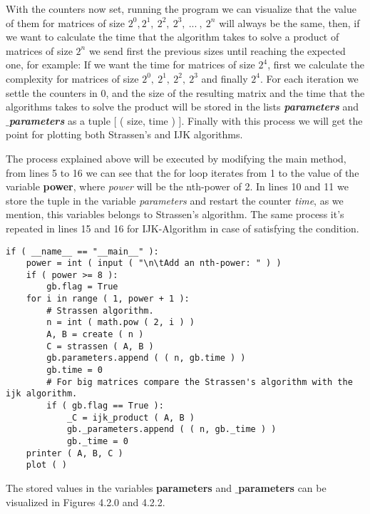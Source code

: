 With the counters now set, running the program we can visualize that the value of them for matrices of size $2^{0}, 2^{1},\ 2^{2},\ 2^{3},\ ...\ ,\ 2^{n}$ will always be the same, then, if we want to calculate the time that the algorithm takes to solve a product of matrices of size $2^{n}$ we send first the previous sizes until reaching the expected one, for example: If we want the time for matrices of size $2^{4}$, first we calculate the complexity for matrices of size $2^{0},\ 2^{1},\ 2^{2},\ 2^{3}$ and finally $2^{4}$. For each iteration we settle the counters in 0, and the size of the resulting matrix and the time that the algorithms takes to solve the product will be stored in the lists {\bfseries\itshape parameters} and {\bfseries\itshape $\_$parameters} as a tuple [ ( size, time ) ]. Finally with this process we will get the point for plotting both Strassen's and IJK algorithms. \hfill \break

The process explained above will be executed by modifying the main method, from lines 5 to 16 we can see that the for loop iterates from 1 to the value of the variable {\bfseries power}, where {\itshape power} will be the nth-power of 2. In lines 10 and 11 we store the tuple in the variable {\itshape parameters} and restart the counter {\itshape time}, as we mention, this variables belongs to Strassen's algorithm. The same process it's repeated in lines 15 and 16 for IJK-Algorithm in case of satisfying the condition. \hfill \break

\begin{lstlisting}
if ( __name__ == "__main__" ):
    power = int ( input ( "\n\tAdd an nth-power: " ) )
    if ( power >= 8 ):
        gb.flag = True
    for i in range ( 1, power + 1 ):
        # Strassen algorithm.
        n = int ( math.pow ( 2, i ) )
        A, B = create ( n )
        C = strassen ( A, B )
        gb.parameters.append ( ( n, gb.time ) )
        gb.time = 0
        # For big matrices compare the Strassen's algorithm with the ijk algorithm.
        if ( gb.flag == True ):
            _C = ijk_product ( A, B )
            gb._parameters.append ( ( n, gb._time ) )
            gb._time = 0
    printer ( A, B, C )
    plot ( )
\end{lstlisting} \hfill

The stored values in the variables {\bfseries parameters} and {\bfseries $\_$parameters} can be visualized in Figures 4.2.0 and 4.2.2.

\pagebreak